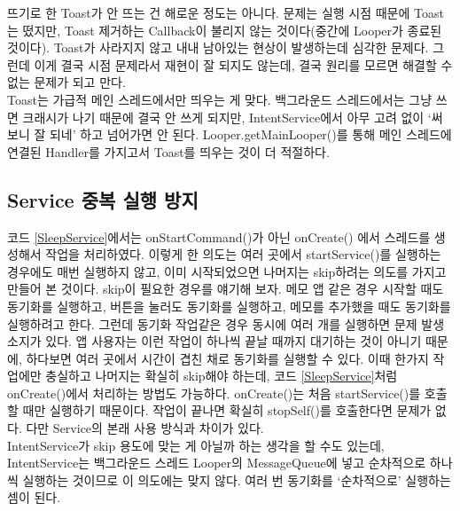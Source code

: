 뜨기로 한 Toast가 안 뜨는 건 해로운 정도는 아니다. 문제는 실행 시점 때문에 Toast는 떴지만, Toast 제거하는 Callback이 불리지 않는 것이다(중간에 Looper가 종료된 것이다).
Toast가 사라지지 않고 내내 남아있는 현상이 발생하는데 심각한 문제다. 그런데 이게 결국 시점 문제라서 재현이 잘 되지도 않는데, 결국 원리를 모르면 해결할 수 없는 문제가 되고 만다.\\

Toast는 가급적 메인 스레드에서만 띄우는 게 맞다. 백그라운드 스레드에서는 그냥 쓰면 크래시가 나기 때문에 결국 안 쓰게 되지만, IntentService에서 아무 고려 없이 `써보니 잘 되네' 하고 넘어가면 안 된다. Looper.getMainLooper()를 통해 메인 스레드에 연결된 Handler를 가지고서 Toast를 띄우는 것이 더 적절하다.

\subsection{Service 중복 실행 방지}
코드 \ref{SleepService}에서는 onStartCommand()가 아닌 onCreate() 에서 스레드를 생성해서 작업을 처리하였다. 
이렇게 한 의도는 여러 곳에서 startService()를 실행하는 경우에도 매번 실행하지 않고, 이미 시작되었으면 나머지는 skip하려는 의도를 가지고 만들어 본 것이다.
skip이 필요한 경우를 얘기해 보자. 
메모 앱 같은 경우 시작할 때도 동기화를 실행하고, 버튼을 눌러도 동기화를 실행하고, 메모를 추가했을 때도 동기화를 실행하려고 한다. 
그런데 동기화 작업같은 경우 동시에 여러 개를 실행하면 문제 발생 소지가 있다. 
앱 사용자는 이런 작업이 하나씩 끝날 때까지 대기하는 것이 아니기 때문에, 하다보면 여러 곳에서 시간이 겹친 채로 동기화를 실행할 수 있다.
이때 한가지 작업에만 충실하고 나머지는 확실히 skip해야 하는데, 코드 \ref{SleepService}처럼 onCreate()에서 처리하는 방법도 가능하다. 
onCreate()는 처음 startService()를 호출할 때만 실행하기 때문이다. 
작업이 끝나면 확실히 stopSelf()를 호출한다면 문제가 없다. 다만 Service의 본래 사용 방식과 차이가 있다.\\

IntentService가 skip 용도에 맞는 게 아닐까 하는 생각을 할 수도 있는데, 
IntentService는 백그라운드 스레드 Looper의 MessageQueue에 넣고 순차적으로 하나씩 실행하는 것이므로 이 의도에는 맞지 않다. 여러 번 동기화를 `순차적으로' 실행하는 셈이 된다.\\

